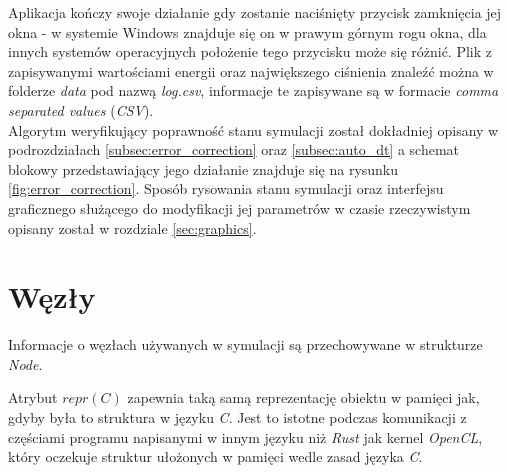 \documentclass[12pt, letterpaper]{report}
\begin{document}
    Aplikacja kończy swoje działanie gdy zostanie naciśnięty przycisk zamknięcia jej okna - w 
    systemie Windows znajduje się on w prawym górnym rogu okna, dla innych systemów operacyjnych 
    położenie tego przycisku może się różnić. Plik z zapisywanymi wartościami energii oraz największego
    ciśnienia znaleźć można w folderze \emph{data} pod nazwą \emph{log.csv}, informacje te 
    zapisywane są w formacie \emph{comma separated values} (\emph{CSV}). \\

    Algorytm weryfikujący poprawność stanu symulacji został dokładniej opisany w podrozdziałach
    \ref{subsec:error_correction} oraz \ref{subsec:auto_dt} a schemat blokowy 
    przedstawiający jego działanie znajduje się na rysunku \ref{fig:error_correction}.
    Sposób rysowania stanu symulacji oraz interfejsu graficznego służącego do modyfikacji jej 
    parametrów w czasie rzeczywistym opisany został w rozdziale \ref{sec:graphics}.


    \clearpage

    \section{Węzły}
    Informacje o węzłach używanych w symulacji są przechowywane w strukturze \emph{Node}.

    
    Atrybut $repr(C)$ zapewnia taką samą reprezentację obiektu w pamięci jak, gdyby była to
    struktura w języku \emph{C}. Jest to istotne podczas komunikacji z częściami programu napisanymi
    w innym języku niż \emph{Rust} jak kernel \emph{OpenCL}, który oczekuje struktur ułożonych w pamięci wedle zasad 
    języka \emph{C}.
\end{document}
